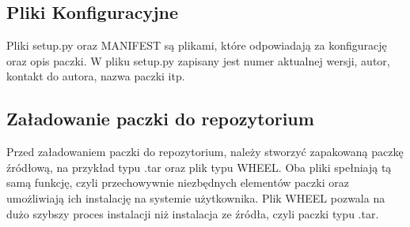 \subsection{Pliki Konfiguracyjne}
\quad Pliki setup.py oraz MANIFEST są plikami, które odpowiadają za konfigurację oraz opis paczki. W pliku setup.py zapisany jest numer aktualnej wersji, autor, kontakt do autora, nazwa paczki itp. 

\quad 


\subsection{Załadowanie paczki do repozytorium}

\quad Przed załadowaniem paczki do repozytorium, należy stworzyć zapakowaną paczkę źródłową, na przykład typu .tar oraz plik typu WHEEL. Oba pliki spełniają tą samą funkcję, czyli przechowywnie niezbędnych elementów paczki oraz umożliwiają ich instalację na systemie użytkownika. Plik WHEEL pozwala na dużo szybszy proces instalacji niż instalacja ze źródła, czyli paczki typu .tar. 
